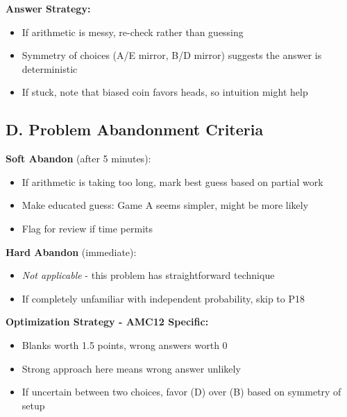\documentclass[]{article}
\begin{document}
\begin{competitionbox}
\textbf{Answer Strategy:}
\begin{itemize}[leftmargin=*]
    \item If arithmetic is messy, re-check rather than guessing
    \item Symmetry of choices (A/E mirror, B/D mirror) suggests the answer is deterministic
    \item If stuck, note that biased coin favors heads, so intuition might help
\end{itemize}

\subsection*{D. Problem Abandonment Criteria}

\textbf{Soft Abandon} (after 5 minutes):
\begin{itemize}[leftmargin=*]
    \item If arithmetic is taking too long, mark best guess based on partial work
    \item Make educated guess: Game A seems simpler, might be more likely
    \item Flag for review if time permits
\end{itemize}

\textbf{Hard Abandon} (immediate):
\begin{itemize}[leftmargin=*]
    \item \textit{Not applicable} - this problem has straightforward technique
    \item If completely unfamiliar with independent probability, skip to P18
\end{itemize}

\textbf{Optimization Strategy - AMC12 Specific:}
\begin{itemize}[leftmargin=*]
    \item Blanks worth 1.5 points, wrong answers worth 0
    \item Strong approach here means wrong answer unlikely
    \item If uncertain between two choices, favor (D) over (B) based on symmetry of setup
\end{itemize}
\end{competitionbox}
\end{document}
